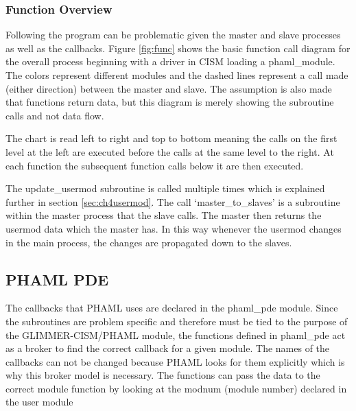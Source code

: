 \subsubsection{Function Overview}

Following the program can be problematic given the master and slave processes as well as the callbacks.  Figure \ref{fig:func} shows the basic function call diagram for the overall process beginning with a driver in CISM loading a phaml\_module.  The colors represent different modules and the dashed lines represent a call made (either direction) between the master and slave.  The assumption is also made that functions return data, but this diagram is merely showing the subroutine calls and not data flow.

The chart is read left to right and top to bottom meaning the calls on the first level at the left are executed before the calls at the same level to the right.  At each function the subsequent function calls below it are then executed.

The update\_usermod subroutine is called multiple times which is explained further in section \ref{sec:ch4usermod}.  The call `master\_to\_slaves' is a subroutine within the master process that the slave calls.  The master then returns the usermod data which the master has.  In this way whenever the usermod changes in the main process, the changes are propagated down to the slaves.



  



\newpage

\subsection{PHAML PDE}\label{sec:ch4phamlpde}

The callbacks that PHAML uses are declared in the phaml\_pde module.  Since the subroutines are problem specific and therefore must be tied to the purpose of the GLIMMER-CISM/PHAML module, the functions defined in phaml\_pde act as a broker to find the correct callback for a given module.  The names of the callbacks can not be changed because PHAML looks for them explicitly which is why this broker model is necessary.  The functions can pass the data to the correct module function by looking at the modnum (module number) declared in the user module

